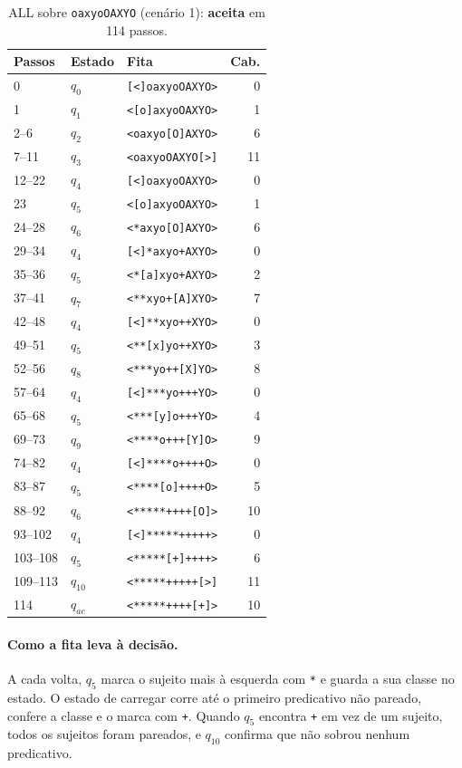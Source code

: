 \documentclass[11pt,a4paper]{article}
\newcommand{\cad}[1]{\texttt{#1}}       %
\begin{document}
{\small
\begin{longtable}{lll r}
\caption{ALL sobre \cad{oaxyoOAXYO} (cenário 1): \textbf{aceita} em 114 passos.}\\
\toprule
Passos & Estado & Fita & Cab. \\
\midrule
\endhead
0 & $q_0$ & \cad{[<]oaxyoOAXYO>} & 0 \\
1 & $q_1$ & \cad{<[o]axyoOAXYO>} & 1 \\
2--6 & $q_2$ & \cad{<oaxyo[O]AXYO>} & 6 \\
7--11 & $q_3$ & \cad{<oaxyoOAXYO[>]} & 11 \\
12--22 & $q_4$ & \cad{[<]oaxyoOAXYO>} & 0 \\
23 & $q_5$ & \cad{<[o]axyoOAXYO>} & 1 \\
24--28 & $q_6$ & \cad{<*axyo[O]AXYO>} & 6 \\
29--34 & $q_4$ & \cad{[<]*axyo+AXYO>} & 0 \\
35--36 & $q_5$ & \cad{<*[a]xyo+AXYO>} & 2 \\
37--41 & $q_7$ & \cad{<**xyo+[A]XYO>} & 7 \\
42--48 & $q_4$ & \cad{[<]**xyo++XYO>} & 0 \\
49--51 & $q_5$ & \cad{<**[x]yo++XYO>} & 3 \\
52--56 & $q_8$ & \cad{<***yo++[X]YO>} & 8 \\
57--64 & $q_4$ & \cad{[<]***yo+++YO>} & 0 \\
65--68 & $q_5$ & \cad{<***[y]o+++YO>} & 4 \\
69--73 & $q_9$ & \cad{<****o+++[Y]O>} & 9 \\
74--82 & $q_4$ & \cad{[<]****o++++O>} & 0 \\
83--87 & $q_5$ & \cad{<****[o]++++O>} & 5 \\
88--92 & $q_6$ & \cad{<*****++++[O]>} & 10 \\
93--102 & $q_4$ & \cad{[<]*****+++++>} & 0 \\
103--108 & $q_5$ & \cad{<*****[+]++++>} & 6 \\
109--113 & $q_{10}$ & \cad{<*****+++++[>]} & 11 \\
114 & $q_{ac}$ & \cad{<*****++++[+]>} & 10 \\
\bottomrule
\end{longtable}}

\paragraph{Como a fita leva à decisão.} A cada volta, $q_5$ marca o sujeito mais à esquerda com \cad{*} e guarda a sua classe no estado. O estado de carregar corre até o primeiro predicativo não pareado, confere a classe e o marca com \cad{+}. Quando $q_5$ encontra \cad{+} em vez de um sujeito, todos os sujeitos foram pareados, e $q_{10}$ confirma que não sobrou nenhum predicativo.
\end{document}
